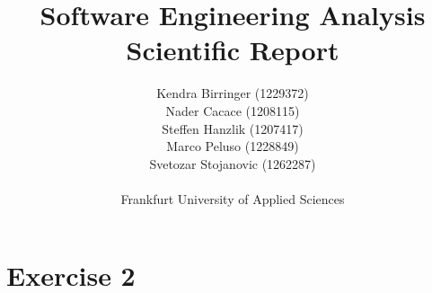 \documentclass{article}
\begin{document}


\title{Software Engineering Analysis Scientific Report}

\author{Kendra Birringer (1229372) \\ Nader Cacace (1208115) \\ Steffen Hanzlik (1207417) \\ Marco Peluso (1228849) \\ Svetozar Stojanovic (1262287)\\
\\
Frankfurt University of Applied Sciences \\}


\maketitle              %
\tableofcontents
\listoffigures
\newpage
\section{Exercise 2}
\end{document}
